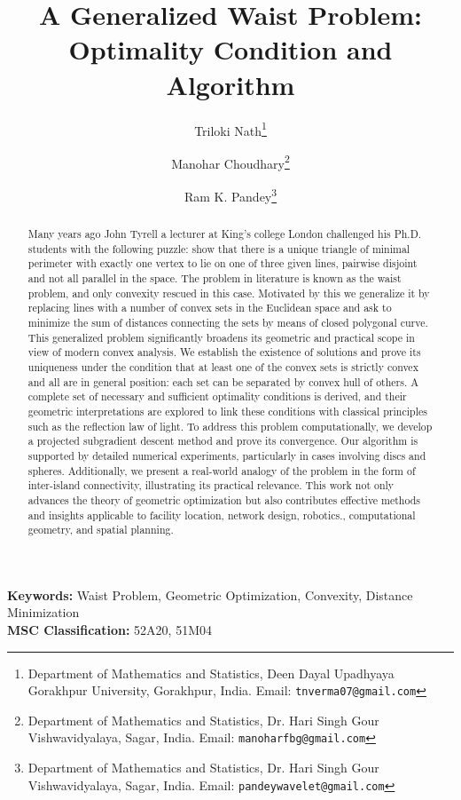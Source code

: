 \documentclass[12pt]{article}
\title{\textbf{A Generalized Waist Problem: Optimality Condition and Algorithm}}
\author[1]{Triloki Nath\thanks{Department of Mathematics and Statistics, 
		Deen Dayal Upadhyaya Gorakhpur University, Gorakhpur, India. 
		Email: \texttt{tnverma07@gmail.com}}}
\author[2]{Manohar Choudhary\thanks{Department of Mathematics and Statistics, 
		Dr. Hari Singh Gour Vishwavidyalaya, Sagar, India. 
		Email: \texttt{manoharfbg@gmail.com}}}
\author[2]{Ram K. Pandey\thanks{Department of Mathematics and Statistics, 
		Dr. Hari Singh Gour Vishwavidyalaya, Sagar, India. 
		Email: \texttt{pandeywavelet@gmail.com}}}
\affil[1]{Department of Mathematics and Statistics, Deen Dayal Upadhyaya Gorakhpur University, Gorakhpur, India}
\affil[2]{Department of Mathematics and Statistics, Dr. Hari Singh Gour Vishwavidyalaya, Sagar, India}
\date{}
\theoremstyle{plain}
\theoremstyle{definition}
\begin{document}
	
	\maketitle
	
	
	\begin{abstract}
		Many years ago John Tyrell a lecturer at King's college London challenged his Ph.D. students with the  following puzzle: show that there is a unique triangle of minimal perimeter with exactly one vertex to lie on one of three  given lines, pairwise disjoint and not all parallel in the space. The problem in literature is known as the waist problem, and only convexity rescued in this case. Motivated by this we generalize it by  replacing lines with a number of  convex sets in the Euclidean space and ask to minimize  the sum of distances connecting the sets by means of closed polygonal curve. This generalized problem significantly broadens its geometric and practical scope in view of modern convex analysis. We establish the existence of solutions and prove its uniqueness under the condition that at least one of the convex sets is strictly convex and all are in general position: each set can be separated by convex hull of others.  A complete set of necessary and sufficient optimality conditions is derived, and their geometric interpretations are explored  to link these conditions with classical principles such as the reflection law of light. To address this problem computationally, we develop a projected subgradient descent method and prove its convergence. Our algorithm is supported by detailed numerical experiments, particularly in cases involving discs and spheres. Additionally, we present a real-world analogy of the problem in the form of inter-island connectivity, illustrating its practical relevance. This work not only advances the theory of geometric optimization but also contributes effective methods and insights applicable to facility location, network design, robotics., computational geometry, and spatial planning.  
	\end{abstract}
	
\textbf{Keywords:} Waist Problem, Geometric Optimization, Convexity, Distance Minimization \\
\textbf{MSC Classification:} 52A20, 51M04
\end{document}
